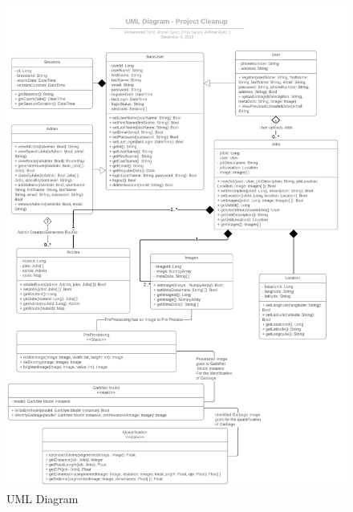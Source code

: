 \newpage
\begin{figure}[!hb]
   \centering
   \includegraphics[scale=0.6]{images/UML.png}
   \caption{UML Diagram}\label{fig:picture}
\end{figure}

